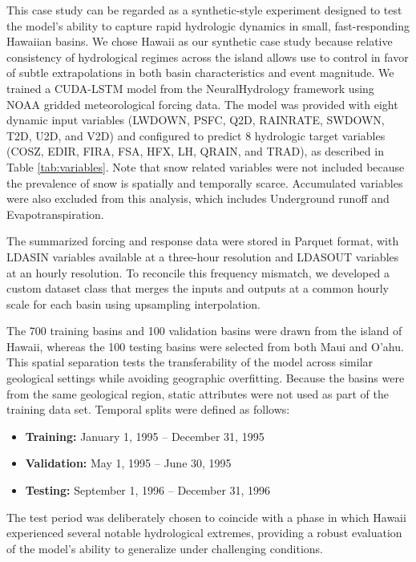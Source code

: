 \documentclass{article}
\begin{document}
This case study can be regarded as a synthetic-style experiment designed to test the model's ability to capture rapid hydrologic dynamics in small, fast-responding Hawaiian basins.  We chose Hawaii as our synthetic case study because relative consistency of hydrological regimes across the island allows use to control in favor of subtle extrapolations in both basin characteristics and event magnitude. We trained a CUDA-LSTM model from the NeuralHydrology framework using NOAA gridded meteorological forcing data. The model was provided with eight dynamic input variables (LWDOWN, PSFC, Q2D, RAINRATE, SWDOWN, T2D, U2D, and V2D) and configured to predict 8 hydrologic target variables (COSZ, EDIR, FIRA, FSA, HFX, LH, QRAIN, and TRAD), as described in Table \ref{tab:variables}. Note that snow related variables were not included because the prevalence of snow is spatially and temporally scarce. Accumulated variables were also excluded from this analysis, which includes Underground runoff and Evapotranspiration.

The summarized forcing and response data were stored in Parquet format, with LDASIN variables available at a three-hour resolution and LDASOUT variables at an hourly resolution. To reconcile this frequency mismatch, we developed a custom dataset class that merges the inputs and outputs at a common hourly scale for each basin using upsampling interpolation.

The 700 training basins and 100 validation basins were drawn from the island of Hawaii, whereas the 100 testing basins were selected from both Maui and O’ahu. This spatial separation tests the transferability of the model across similar geological settings while avoiding geographic overfitting. Because the basins were from the same geological region, static attributes were not used as part of the training data set. Temporal splits were defined as follows:

\begin{itemize}
    \item \textbf{Training:} January 1, 1995 -- December 31, 1995
    \item \textbf{Validation:} May 1, 1995 -- June 30, 1995
    \item \textbf{Testing:} September 1, 1996 -- December 31, 1996
\end{itemize}

The test period was deliberately chosen to coincide with a phase in which Hawaii experienced several notable hydrological extremes, providing a robust evaluation of the model's ability to generalize under challenging conditions.
\end{document}
